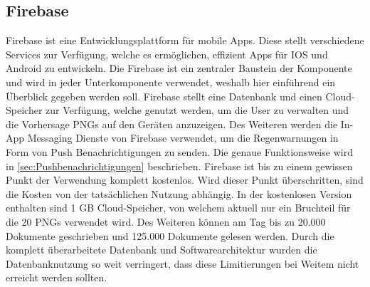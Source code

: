 \subsection{Firebase}\label{firebase}
Firebase ist eine Entwicklungsplattform für mobile Apps. 
Diese stellt verschiedene Services zur Verfügung, welche es ermöglichen, effizient Apps für IOS und Android zu entwickeln. 
Die Firebase ist ein zentraler Baustein der Komponente und wird in jeder Unterkomponente verwendet, weshalb hier einführend 
ein Überblick gegeben werden soll. 
Firebase stellt eine Datenbank und einen Cloud-Speicher zur Verfügung, welche genutzt werden, um die User zu verwalten und die 
Vorhersage PNGs auf den Geräten anzuzeigen.
Des Weiteren werden die In-App Messaging Dienste von Firebase verwendet, um die Regenwarnungen in Form von Push Benachrichtigungen zu senden. 
Die genaue Funktionsweise wird in \ref{sec:Pushbenachrichtigungen} beschrieben.   
Firebase ist bis zu einem gewissen Punkt der Verwendung komplett kostenlos. 
Wird dieser Punkt überschritten, sind die Kosten von der tatsächlichen Nutzung abhängig. 
In der kostenlosen Version enthalten sind 1 GB Cloud-Speicher, von welchem aktuell nur ein Bruchteil für die 20 PNGs 
verwendet wird. Des Weiteren können am Tag bis zu 20.000 Dokumente geschrieben und 125.000 Dokumente gelesen werden. 
Durch die komplett überarbeitete Datenbank und Softwarearchitektur wurden die Datenbanknutzung so weit verringert, 
dass diese Limitierungen bei Weitem nicht erreicht werden sollten.